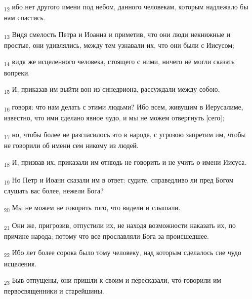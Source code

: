 \begin{tcolorbox}
\textsubscript{12} ибо нет другого имени под небом, данного человекам, которым надлежало бы нам спастись.
\end{tcolorbox}
\begin{tcolorbox}
\textsubscript{13} Видя смелость Петра и Иоанна и приметив, что они люди некнижные и простые, они удивлялись, между тем узнавали их, что они были с Иисусом;
\end{tcolorbox}
\begin{tcolorbox}
\textsubscript{14} видя же исцеленного человека, стоящего с ними, ничего не могли сказать вопреки.
\end{tcolorbox}
\begin{tcolorbox}
\textsubscript{15} И, приказав им выйти вон из синедриона, рассуждали между собою,
\end{tcolorbox}
\begin{tcolorbox}
\textsubscript{16} говоря: что нам делать с этими людьми? Ибо всем, живущим в Иерусалиме, известно, что ими сделано явное чудо, и мы не можем отвергнуть [сего];
\end{tcolorbox}
\begin{tcolorbox}
\textsubscript{17} но, чтобы более не разгласилось это в народе, с угрозою запретим им, чтобы не говорили об имени сем никому из людей.
\end{tcolorbox}
\begin{tcolorbox}
\textsubscript{18} И, призвав их, приказали им отнюдь не говорить и не учить о имени Иисуса.
\end{tcolorbox}
\begin{tcolorbox}
\textsubscript{19} Но Петр и Иоанн сказали им в ответ: судите, справедливо ли пред Богом слушать вас более, нежели Бога?
\end{tcolorbox}
\begin{tcolorbox}
\textsubscript{20} Мы не можем не говорить того, что видели и слышали.
\end{tcolorbox}
\begin{tcolorbox}
\textsubscript{21} Они же, пригрозив, отпустили их, не находя возможности наказать их, по причине народа; потому что все прославляли Бога за происшедшее.
\end{tcolorbox}
\begin{tcolorbox}
\textsubscript{22} Ибо лет более сорока было тому человеку, над которым сделалось сие чудо исцеления.
\end{tcolorbox}
\begin{tcolorbox}
\textsubscript{23} Быв отпущены, они пришли к своим и пересказали, что говорили им первосвященники и старейшины.
\end{tcolorbox}
